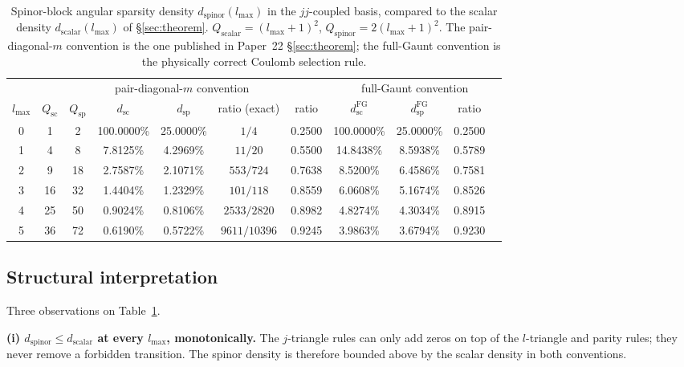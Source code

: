 \begin{table}[h]
\caption{Spinor-block angular sparsity density $d_{\mathrm{spinor}}(l_{\max})$
in the $jj$-coupled basis, compared to the scalar density
$d_{\mathrm{scalar}}(l_{\max})$ of
\S\ref{sec:theorem}. $Q_{\mathrm{scalar}} = (l_{\max}+1)^2$,
$Q_{\mathrm{spinor}} = 2(l_{\max}+1)^2$. The pair-diagonal-$m$
convention is the one published in Paper~22 \S\ref{sec:theorem}; the
full-Gaunt convention is the physically correct Coulomb selection rule.}
\label{tab:d_spinor}
\begin{ruledtabular}
\begin{tabular}{c|cccccc|cccc}
 & \multicolumn{6}{c|}{pair-diagonal-$m$ convention} & \multicolumn{4}{c}{full-Gaunt convention} \\
$l_{\max}$ & $Q_{\mathrm{sc}}$ & $Q_{\mathrm{sp}}$ & $d_{\mathrm{sc}}$ & $d_{\mathrm{sp}}$ & ratio (exact) & ratio & $d_{\mathrm{sc}}^{\mathrm{FG}}$ & $d_{\mathrm{sp}}^{\mathrm{FG}}$ & ratio \\
\hline
0 & 1  & 2  & 100.0000\% & 25.0000\% & $1/4$        & 0.2500 & 100.0000\% & 25.0000\% & 0.2500 \\
1 & 4  & 8  & 7.8125\%   & 4.2969\%  & $11/20$      & 0.5500 & 14.8438\%  & 8.5938\%  & 0.5789 \\
2 & 9  & 18 & 2.7587\%   & 2.1071\%  & $553/724$    & 0.7638 & 8.5200\%   & 6.4586\%  & 0.7581 \\
3 & 16 & 32 & 1.4404\%   & 1.2329\%  & $101/118$    & 0.8559 & 6.0608\%   & 5.1674\%  & 0.8526 \\
4 & 25 & 50 & 0.9024\%   & 0.8106\%  & $2533/2820$  & 0.8982 & 4.8274\%   & 4.3034\%  & 0.8915 \\
5 & 36 & 72 & 0.6190\%   & 0.5722\%  & $9611/10396$ & 0.9245 & 3.9863\%   & 3.6794\%  & 0.9230 \\
\end{tabular}
\end{ruledtabular}
\end{table}

\subsection{Structural interpretation}

Three observations on Table~\ref{tab:d_spinor}.

\textbf{(i) $d_{\mathrm{spinor}} \leq d_{\mathrm{scalar}}$ at every $l_{\max}$, monotonically.}
The $j$-triangle rules can only add zeros on top of the $l$-triangle
and parity rules; they never remove a forbidden transition. The
spinor density is therefore bounded above by the scalar density in
both conventions.

